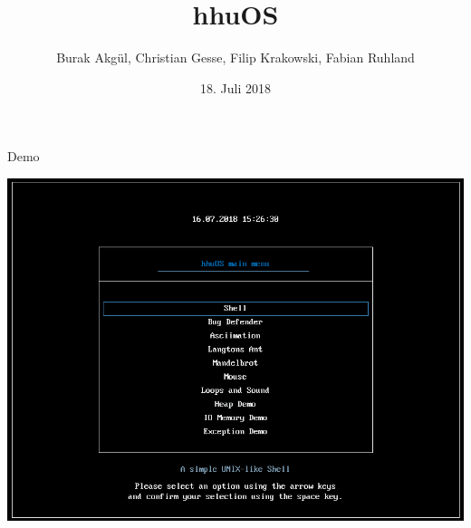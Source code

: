 \documentclass[german,aspectratio=169]{beamer}
\title{hhuOS}
\date{18. Juli 2018}
\author{Burak Akgül, Christian Gesse, Filip Krakowski, Fabian Ruhland}
\institute{Institute of Computer Science \\
	Heinrich-Heine-University Düsseldorf}
\begin{document}
	
	\maketitle
	
	
	
	

	

	
	
	
	
	\begin{frame}[standout]{Demo}
		\begin{center}
			\includegraphics[width=.6\textwidth]{img/hhuos_main}
		\end{center}	
	\end{frame}
\end{document}
